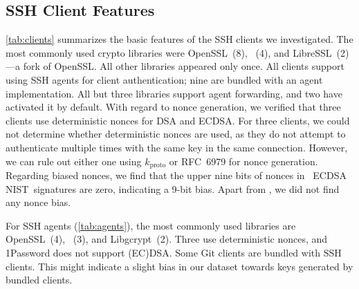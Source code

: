 \label{sec:050-signatures}

\subsection{SSH Client Features}
\label{subsec:sshclientfeatures}

\autoref{tab:clients} summarizes the basic features of the \nrClients SSH clients we investigated. The most commonly used crypto libraries were OpenSSL~(8), \putty~(4), and LibreSSL~(2)---a fork of OpenSSL. All other libraries appeared only once. All clients support using SSH agents for client authentication; nine are bundled with an agent implementation. All but three libraries support agent forwarding, and two have activated it by default. With regard to nonce generation, we verified that three clients use deterministic nonces for DSA and ECDSA. For three clients, we could not determine whether deterministic nonces are used, as they do not attempt to authenticate multiple times with the same key in the same connection. However, we can rule out either one using $k_\text{proto}$ or RFC~6979 for nonce generation. Regarding biased nonces, we find that the upper nine bits of nonces in \putty~\puttyvulnversion ECDSA NIST~\pfivetwoone signatures are zero, indicating a 9-bit bias. Apart from \putty, we did not find any nonce bias.

For SSH agents (\autoref{tab:agents}), the most commonly used libraries are OpenSSL~(4), \putty~(3), and Libgcrypt~(2). Three use deterministic nonces, and 1Password does not support (EC)DSA. Some Git clients are bundled with SSH clients. This might indicate a slight bias in our dataset towards keys generated by bundled clients.

